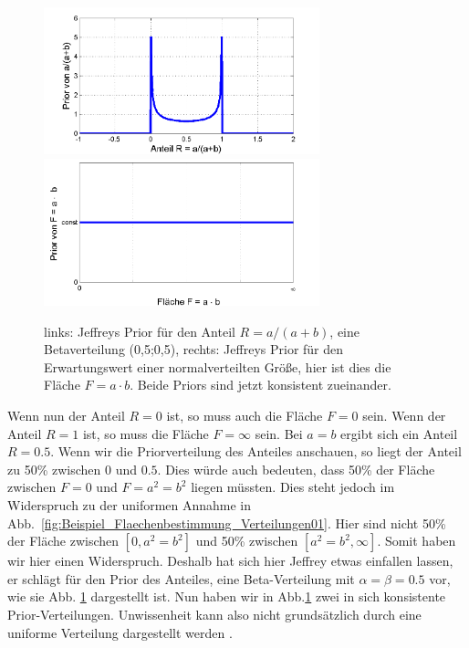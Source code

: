 \begin{figure}[!ht]
	\begin{center}
		\includegraphics[width=80mm]{08_vorlesung/media/prior_des_Anteils_2.png}
		\includegraphics[width=80mm]{08_vorlesung/media/prior_der_Flaeche_2.png}
		\caption{ links: Jeffreys Prior für den Anteil $R=a/(a+b)$, eine Betaverteilung (0,5;0,5), rechts: Jeffreys Prior für den Erwartungswert einer normalverteilten Größe, hier ist dies die Fläche $F = a\cdot b.$ Beide Priors sind jetzt konsistent zueinander.}
		\label{fig:Beispiel_Flaechenbestimmung_Verteilungen02}
	\end{center}
\end{figure}
Wenn nun der Anteil $R=0$ ist, so muss auch die Fläche $F=0$ sein. 
Wenn der Anteil $R=1$ ist, so muss die Fläche $F=\infty$ sein. 
Bei $a=b$ ergibt sich ein Anteil $R=0.5$. Wenn wir die Priorverteilung
des Anteiles anschauen, so liegt der Anteil zu 50\% zwischen $0$
und $0.5$. Dies würde auch bedeuten, dass 50\% der Fläche zwischen
$F=0$ und $F=a^2= b^2$ liegen müssten. Dies steht jedoch im Widerspruch
zu der uniformen Annahme in Abb.~\ref{fig:Beispiel_Flaechenbestimmung_Verteilungen01}. 
Hier sind nicht 50\% der Fläche zwischen $[0,a^2=b^2]$ und 50\%
zwischen $[a^2=b^2,\infty]$.
Somit haben wir hier einen Widerspruch.
Deshalb hat sich hier Jeffrey \cite{Hel08} etwas einfallen lassen, 
er schlägt für den Prior des Anteiles, eine Beta-Verteilung
mit $\alpha = \beta = 0.5 $ vor, wie sie Abb. \ref{fig:Beispiel_Flaechenbestimmung_Verteilungen02} dargestellt ist. Nun haben wir in Abb.\ref{fig:Beispiel_Flaechenbestimmung_Verteilungen02} 
zwei in sich konsistente Prior-Verteilungen.
Unwissenheit kann also nicht grundsätzlich durch eine uniforme Verteilung
dargestellt werden \cite{Tsc14}.

